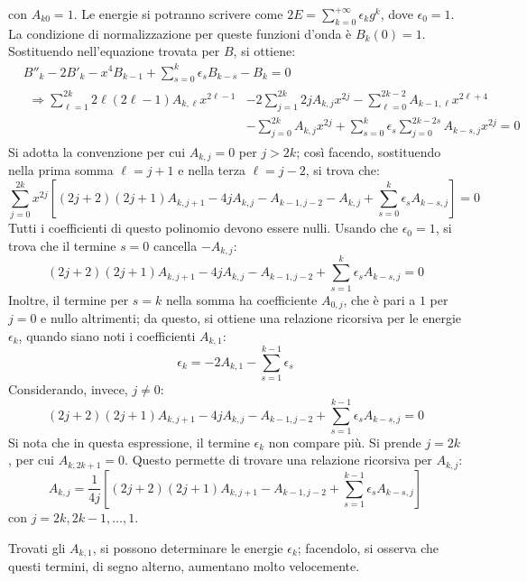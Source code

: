 \documentclass[11pt, a4paper]{scrartcl} %
\numberwithin{equation}{section}
\theoremstyle{style2}
\theoremstyle{style1}
\begin{document}
con $A_{k0}=1 $.
Le energie si potranno scrivere come $2E = \sum_{k=0}^{+\infty} \epsilon _k g^k$, dove $\epsilon _0 = 1$.
La condizione di normalizzazione per queste funzioni d'onda \`e $B_k(0) = 1$. 
Sostituendo nell'equazione trovata per $B$, si ottiene:
\[
	\begin{split}
		&B''_k - 2B'_k - x^4 B_{k-1} + \sum_{s=0}^{k} \epsilon _s B_{k-s} - B_k = 0\\
		&\begin{split}
			\Rightarrow \sum_{\ell =1}^{2k} 2\ell (2\ell -1) A_{k,\ell } x^{2\ell -1} &-2 \sum_{j=1}^{2k} 2j A_{k,j} x^{2j}  - \sum_{\ell =0}^{2k-2} A_{k-1,\ell } x^{2\ell +4} \\
			&- \sum_{j=0}^{2k} A_{k,j} x^{2j}  + \sum_{s=0}^{k} \epsilon _s \sum_{j=0}^{2k-2s} A_{k-s,j} x^{2j} =0
		\end{split}
	\end{split}
\] 
Si adotta la convenzione per cui $A_{k,j} = 0$ per $j > 2k$; cos\`i facendo, sostituendo nella prima somma $\ell = j +1$ e nella terza $\ell = j-2$, si trova che:
\begin{equation*}
	\sum_{j=0}^{2k} x^{2j}\left[ (2j+2)(2j+1) A_{k,j+1} -4j A_{k,j}  - A_{k-1,j-2} -A_{k,j} + \sum_{s=0}^{k} \epsilon _s A_{k-s,j}  \right]  = 0
\end{equation*}
Tutti i coefficienti di questo polinomio devono essere nulli. 
Usando che $\epsilon _0 = 1$, si trova che il termine $s=0$ cancella $-A_{k,j} $:
\begin{equation}
	(2j+2)(2j+1) A_{k,j+1} - 4j A_{k,j} - A_{k-1,j-2} + \sum_{s=1}^{k} \epsilon _s A_{k-s,j} =0
\end{equation}
Inoltre, il termine per $s=k$ nella somma ha coefficiente $A_{0,j} $, che \`e pari a $1$ per $j=0$ e nullo altrimenti; da questo, si ottiene una relazione ricorsiva per le energie $\epsilon _k$, quando siano noti i coefficienti $A_{k,1} $:
\begin{equation}
	\epsilon _k = -2A_{k,1} - \sum_{s=1}^{k-1} \epsilon _s
\end{equation}
Considerando, invece, $j\neq 0 $:
\begin{equation*}
	(2j+2)(2j+1) A_{k,j+1} - 4j A_{k,j} - A_{k-1,j-2} + \sum_{s=1}^{k-1} \epsilon _s A_{k-s,j} =0
\end{equation*}
Si nota che in questa espressione, il termine $\epsilon _k$ non compare pi\`u.
Si prende $j=2k$, per cui $A_{k,2k+1} =0$. 
Questo permette di trovare una relazione ricorsiva per $A_{k,j} $:
\begin{equation}
	A_{k,j} = \frac{1}{4j} \left[ (2j+2)(2j+1)A_{k,j+1} -A_{k-1,j-2} +\sum_{s=1}^{k-1} \epsilon _s A_{k-s,j}  \right] 
\end{equation}
con $j=2k,2k-1, \ldots, 1$.

Trovati gli $A_{k,1} $, si possono determinare le energie $\epsilon _k$; facendolo, si osserva che questi termini, di segno alterno, aumentano molto velocemente.
\end{document}
